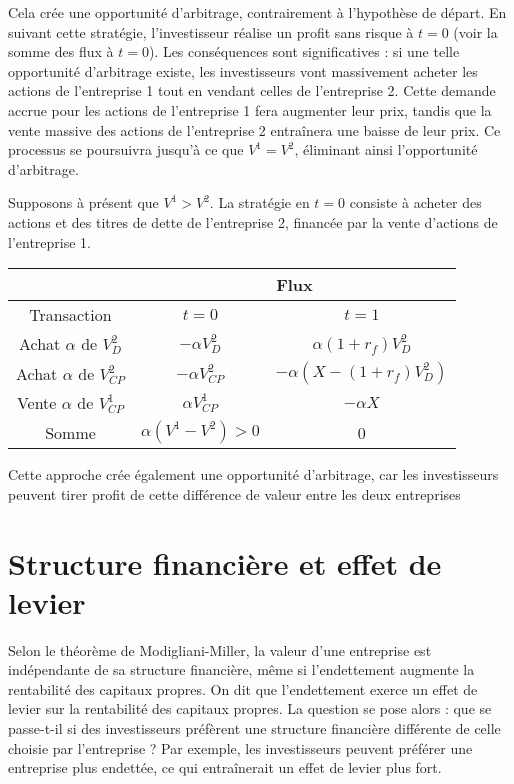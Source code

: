\documentclass[a4paper, 12pt]{report}
\begin{document}
Cela crée une opportunité d'arbitrage, contrairement à l'hypothèse de départ. En suivant cette stratégie, l'investisseur réalise un profit sans risque à \( t = 0 \) (voir la somme des flux à \( t = 0 \)). Les conséquences sont significatives : si une telle opportunité d'arbitrage existe, les investisseurs vont massivement acheter les actions de l'entreprise 1 tout en vendant celles de l'entreprise 2. Cette demande accrue pour les actions de l'entreprise 1 fera augmenter leur prix, tandis que la vente massive des actions de l'entreprise 2 entraînera une baisse de leur prix. Ce processus se poursuivra jusqu'à ce que \( V^1 = V^2 \), éliminant ainsi l'opportunité d'arbitrage.

Supposons à présent que \( V^1 > V^2 \). La stratégie en \( t = 0 \) consiste à acheter des actions et des titres de dette de l'entreprise 2, financée par la vente d'actions de l'entreprise 1. 


\begin{center}
	\begin{tabular}{@{}ccc@{}}
		\toprule
		& \multicolumn{2}{c}{Flux}                        \\ \midrule
		Transaction                  & $t=0$               & $t=1$                     \\
		Achat $\alpha$ de $V_D^2$    & $-\alpha V_D^2$     & $\alpha(1+r_f)V_D^2$      \\
		Achat $\alpha$ de $V_{CP}^2$ & $-\alpha  V_{CP}^2$ & $-\alpha(X-(1+r_f)V_D^2)$ \\
		Vente $\alpha$ de $V_{CP}^1$ & $\alpha V_{CP}^1$   & $-\alpha X$               \\
		Somme                        & $\alpha(V^1-V^2)>0$ & 0                         \\ \bottomrule
	\end{tabular}
\end{center}
Cette approche crée également une opportunité d'arbitrage, car les investisseurs peuvent tirer profit de cette différence de valeur entre les deux entreprises

\section{Structure financière et effet de levier}

Selon le théorème de Modigliani-Miller, la valeur d'une entreprise est indépendante de sa structure financière, même si l'endettement augmente la rentabilité des capitaux propres. On dit que l'endettement exerce un effet de levier sur la rentabilité des capitaux propres. La question se pose alors : que se passe-t-il si des investisseurs préfèrent une structure financière différente de celle choisie par l'entreprise ? Par exemple, les investisseurs peuvent préférer une entreprise plus endettée, ce qui entraînerait un effet de levier plus fort.
\end{document}
